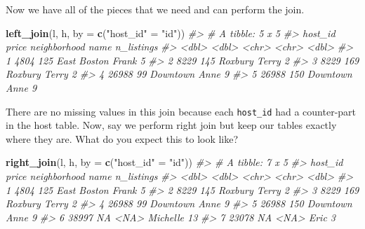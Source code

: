 \documentclass[
]{book}
\newenvironment{Shaded}{\begin{snugshade}}{\end{snugshade}}
\newcommand{\CommentTok}[1]{\textcolor[rgb]{0.56,0.35,0.01}{\textit{#1}}}
\newcommand{\DataTypeTok}[1]{\textcolor[rgb]{0.13,0.29,0.53}{#1}}
\newcommand{\KeywordTok}[1]{\textcolor[rgb]{0.13,0.29,0.53}{\textbf{#1}}}
\newcommand{\NormalTok}[1]{#1}
\newcommand{\StringTok}[1]{\textcolor[rgb]{0.31,0.60,0.02}{#1}}
\begin{document}
Now we have all of the pieces that we need and can perform the join.

\begin{Shaded}
\begin{Highlighting}[]
\KeywordTok{left\_join}\NormalTok{(l, h, }\DataTypeTok{by =} \KeywordTok{c}\NormalTok{(}\StringTok{"host\_id"}\NormalTok{ =}\StringTok{ "id"}\NormalTok{))}
\CommentTok{\#\textgreater{} \# A tibble: 5 x 5}
\CommentTok{\#\textgreater{}   host\_id price neighborhood name  n\_listings}
\CommentTok{\#\textgreater{}     \textless{}dbl\textgreater{} \textless{}dbl\textgreater{} \textless{}chr\textgreater{}        \textless{}chr\textgreater{}      \textless{}dbl\textgreater{}}
\CommentTok{\#\textgreater{} 1    4804   125 East Boston  Frank          5}
\CommentTok{\#\textgreater{} 2    8229   145 Roxbury      Terry          2}
\CommentTok{\#\textgreater{} 3    8229   169 Roxbury      Terry          2}
\CommentTok{\#\textgreater{} 4   26988    99 Downtown     Anne           9}
\CommentTok{\#\textgreater{} 5   26988   150 Downtown     Anne           9}
\end{Highlighting}
\end{Shaded}

There are no missing values in this join because each \texttt{host\_id} had a counter-part in the host table. Now, say we perform right join but keep our tables exactly where they are. What do you expect this to look like?

\begin{Shaded}
\begin{Highlighting}[]
\KeywordTok{right\_join}\NormalTok{(l, h, }\DataTypeTok{by =} \KeywordTok{c}\NormalTok{(}\StringTok{"host\_id"}\NormalTok{ =}\StringTok{ "id"}\NormalTok{))}
\CommentTok{\#\textgreater{} \# A tibble: 7 x 5}
\CommentTok{\#\textgreater{}   host\_id price neighborhood name     n\_listings}
\CommentTok{\#\textgreater{}     \textless{}dbl\textgreater{} \textless{}dbl\textgreater{} \textless{}chr\textgreater{}        \textless{}chr\textgreater{}         \textless{}dbl\textgreater{}}
\CommentTok{\#\textgreater{} 1    4804   125 East Boston  Frank             5}
\CommentTok{\#\textgreater{} 2    8229   145 Roxbury      Terry             2}
\CommentTok{\#\textgreater{} 3    8229   169 Roxbury      Terry             2}
\CommentTok{\#\textgreater{} 4   26988    99 Downtown     Anne              9}
\CommentTok{\#\textgreater{} 5   26988   150 Downtown     Anne              9}
\CommentTok{\#\textgreater{} 6   38997    NA \textless{}NA\textgreater{}         Michelle         13}
\CommentTok{\#\textgreater{} 7   23078    NA \textless{}NA\textgreater{}         Eric              3}
\end{Highlighting}
\end{Shaded}
\end{document}
